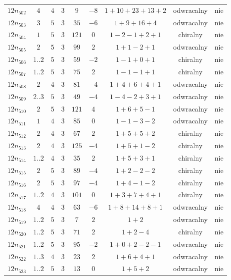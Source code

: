 \begin{longtable}{ccccccccc}
$12n_{502}$ & $4$ & $4$ & $3$ & $9$ & $-8$ & $1+10+23+13+2$ & odwracalny & nie \\
$12n_{503}$ & $3$ & $5$ & $3$ & $35$ & $-6$ & $1+9+16+4$ & odwracalny & nie \\
$12n_{504}$ & $1$ & $5$ & $3$ & $121$ & $0$ & $1-2-1+2+1$ & chiralny & nie \\
$12n_{505}$ & $2$ & $5$ & $3$ & $99$ & $2$ & $1+1-2+1$ & odwracalny & nie \\
$12n_{506}$ & $1..2$ & $5$ & $3$ & $59$ & $-2$ & $1-1+0+1$ & chiralny & nie \\
$12n_{507}$ & $1..2$ & $5$ & $3$ & $75$ & $2$ & $1-1-1+1$ & chiralny & nie \\
$12n_{508}$ & $2$ & $4$ & $3$ & $81$ & $-4$ & $1+4+6+4+1$ & odwracalny & nie \\
$12n_{509}$ & $2..3$ & $5$ & $3$ & $49$ & $-4$ & $1-4-2+3+1$ & odwracalny & nie \\
$12n_{510}$ & $2$ & $5$ & $3$ & $121$ & $4$ & $1+6+5-1$ & odwracalny & nie \\
$12n_{511}$ & $1$ & $4$ & $3$ & $85$ & $0$ & $1-1-3-2$ & odwracalny & nie \\
$12n_{512}$ & $2$ & $4$ & $3$ & $67$ & $2$ & $1+5+5+2$ & chiralny & nie \\
$12n_{513}$ & $2$ & $4$ & $3$ & $125$ & $-4$ & $1+5+1-2$ & chiralny & nie \\
$12n_{514}$ & $1..2$ & $4$ & $3$ & $35$ & $2$ & $1+5+3+1$ & chiralny & nie \\
$12n_{515}$ & $2$ & $5$ & $3$ & $89$ & $-4$ & $1+2-2-2$ & chiralny & nie \\
$12n_{516}$ & $2$ & $5$ & $3$ & $97$ & $-4$ & $1+4-1-2$ & chiralny & nie \\
$12n_{517}$ & $1..2$ & $4$ & $3$ & $101$ & $0$ & $1+3+7+4+1$ & chiralny & nie \\
$12n_{518}$ & $4$ & $4$ & $3$ & $63$ & $-6$ & $1+8+14+8+1$ & odwracalny & nie \\
$12n_{519}$ & $1..2$ & $5$ & $3$ & $7$ & $2$ & $1+2$ & odwracalny & nie \\
$12n_{520}$ & $1..2$ & $5$ & $3$ & $71$ & $2$ & $1+2-4$ & chiralny & nie \\
$12n_{521}$ & $1..2$ & $5$ & $3$ & $95$ & $-2$ & $1+0+2-2-1$ & odwracalny & nie \\
$12n_{522}$ & $1..3$ & $4$ & $3$ & $23$ & $2$ & $1+6+4+1$ & odwracalny & nie \\
$12n_{523}$ & $1..2$ & $5$ & $3$ & $13$ & $0$ & $1+5+2$ & odwracalny & nie \\

\end{longtable}

